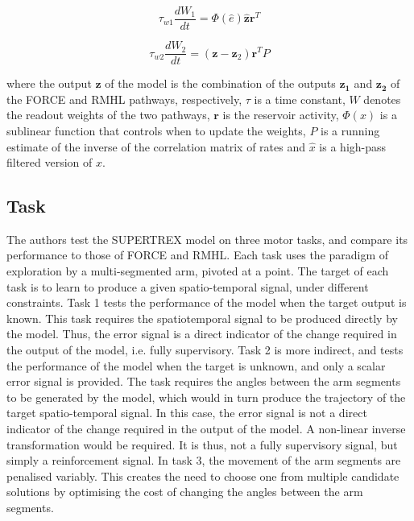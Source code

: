 \begin{equation}
    \tau_{w 1} \frac{d W_{1}}{d t}=\Phi(\hat{e}) \hat{\mathbf{z}} \mathbf{r}^{T}
\end{equation}

\begin{equation}
    \tau_{w 2} \frac{d W_{2}}{d t}=\left(\mathbf{z}-\mathbf{z}_{2}\right) \mathbf{r}^{T} P
\end{equation}
    
where the output $\mathbf{z}$ of the model is the combination of the outputs $\mathbf{z_1}$ and $\mathbf{z_2}$ of the FORCE and RMHL pathways, respectively, $\tau$ is a time constant, $W$ denotes the readout weights of the two pathways, $\mathbf{r}$ is the reservoir activity,  $\Phi(x)$ is a sublinear function that controls when to update the weights, $P$ is a running estimate of the inverse of the correlation matrix of rates and $\hat{x}$  is a high-pass filtered version of $x$.


\subsection{Task}

The authors test the SUPERTREX model on three motor tasks, and compare its performance to those of FORCE and RMHL. Each task uses the paradigm of exploration by a multi-segmented arm, pivoted at a point. The target of each task is to learn to produce a given spatio-temporal signal, under different constraints. Task 1 tests the performance of the model when the target output is known. This task requires the spatiotemporal signal to be produced directly by the model. Thus, the error signal is a direct indicator of the change required in the output of the model, i.e. fully supervisory. Task 2 is more indirect, and tests the performance of the model when the target is unknown, and only a scalar error signal is provided. The task requires the angles between the arm segments to be generated by the model, which would in turn produce the trajectory of the target spatio-temporal signal. In this case, the error signal is not a direct indicator of the change required in the output of the model. A non-linear inverse transformation would be required. It is thus, not a fully supervisory signal, but simply a reinforcement signal. In task 3, the movement of the arm segments are penalised variably. This creates the need to choose one from multiple candidate solutions by optimising the cost of changing the angles between the arm segments.


